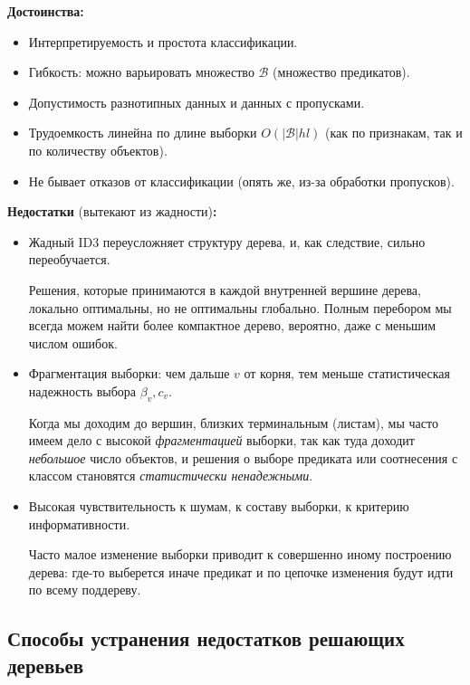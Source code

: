 \documentclass{article}
\begin{document}
\textbf{Достоинства:}

\begin{itemize}
\item Интерпретируемость и простота классификации.

\item Гибкость: можно варьировать множество $\mathscr{B}$ (множество предикатов).

\item Допустимость разнотипных данных и данных с пропусками.
\item Трудоемкость линейна по длине выборки $O(|\mathscr{B}|hl)$ (как по признакам, так и по количеству объектов).

\item Не бывает отказов от классификации (опять же, из-за обработки пропусков).
\end{itemize}

\textbf{Недостатки} (вытекают из жадности)\textbf{:}

\begin{itemize}
\item Жадный ID3 переусложняет структуру дерева, и, как следствие, сильно переобучается.

	Решения, которые принимаются в каждой внутренней вершине дерева, локально оптимальны, но не оптимальны глобально. Полным перебором мы всегда можем найти более компактное дерево, вероятно, даже с меньшим числом ошибок.
	
\item Фрагментация выборки: чем дальше $v$ от корня, тем меньше статистическая надежность выбора $\beta_v, c_v$.

	Когда мы доходим до вершин, близких терминальным (листам), мы часто имеем дело с высокой \textit{фрагментацией} выборки, так как туда доходит \textit{небольшое} число объектов, и решения о выборе предиката или соотнесения с классом становятся \textit{статистически ненадежными}.
	
\item Высокая чувствительность к шумам, к составу выборки, к критерию информативности.

	Часто малое изменение выборки приводит к совершенно иному построению дерева: где-то выберется иначе предикат и по цепочке изменения будут идти по всему поддереву.
\end{itemize}

\newpage
\subsection{Способы устранения недостатков решающих деревьев}
\end{document}
